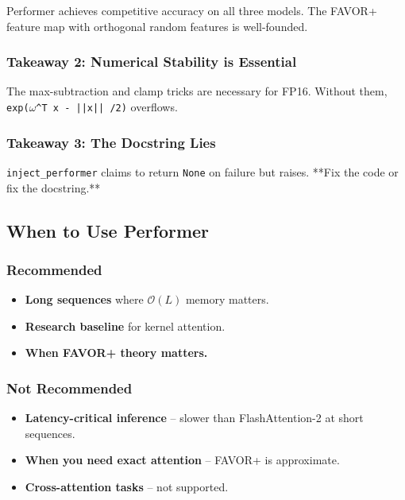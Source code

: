 Performer achieves competitive accuracy on all three models. The FAVOR+ 
feature map with orthogonal random features is well-founded.

\subsubsection{Takeaway 2: Numerical Stability is Essential}

The max-subtraction and clamp tricks are necessary for FP16. Without them, 
\texttt{exp($\omega$^T x - ||x|| /2)} overflows.

\subsubsection{Takeaway 3: The Docstring Lies}

\texttt{inject\_performer} claims to return \texttt{None} on failure but raises. **Fix 
the code or fix the docstring.**

\subsection{When to Use Performer}

\subsubsection{Recommended}

\begin{itemize}
\item \textbf{Long sequences} where $\mathcal{O}(L)$ memory matters.
\item \textbf{Research baseline} for kernel attention.
\item \textbf{When FAVOR+ theory matters.}

\end{itemize}
\subsubsection{Not Recommended}

\begin{itemize}
\item \textbf{Latency-critical inference} -- slower than FlashAttention-2 at short
  sequences.
\item \textbf{When you need exact attention} -- FAVOR+ is approximate.
\item \textbf{Cross-attention tasks} -- not supported.

\end{itemize}
